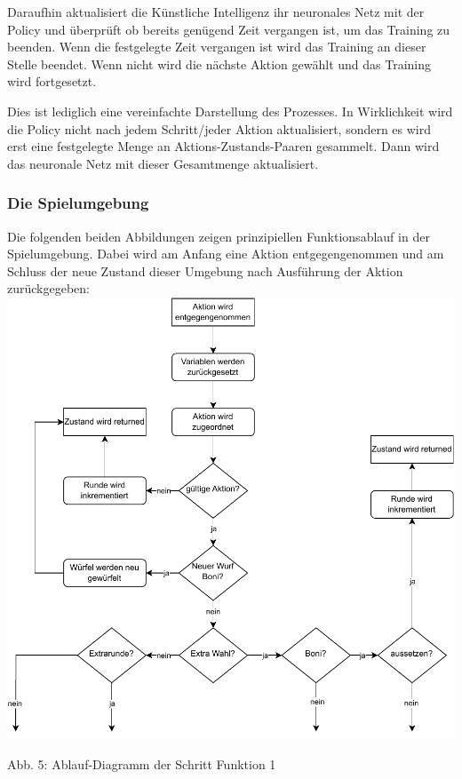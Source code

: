 Daraufhin aktualisiert die Künstliche Intelligenz ihr neuronales Netz mit der Policy und überprüft ob bereits genügend Zeit vergangen ist, um das Training zu beenden. Wenn die festgelegte Zeit vergangen ist wird das Training an dieser Stelle beendet. Wenn nicht wird die nächste Aktion gewählt und das Training wird fortgesetzt.

Dies ist lediglich eine vereinfachte Darstellung des Prozesses. In Wirklichkeit wird die Policy nicht nach jedem Schritt/jeder Aktion aktualisiert, sondern es wird erst eine festgelegte Menge an Aktions-Zustands-Paaren gesammelt. Dann wird das neuronale Netz mit dieser Gesamtmenge aktualisiert.
\subsubsection{Die Spielumgebung}
\begin{minipage}{\linewidth}
	Die folgenden beiden Abbildungen zeigen prinzipiellen Funktionsablauf in der Spielumgebung. Dabei wird am Anfang eine Aktion entgegengenommen und am Schluss der neue Zustand dieser Umgebung nach Ausführung der Aktion zurückgegeben:\\
	
	\vspace{0.5cm}
	\includegraphics[width=1\textwidth]{Bilder/step3.drawio} 
	
	Abb. 5: Ablauf-Diagramm der Schritt Funktion 1 \\
\end{minipage}

